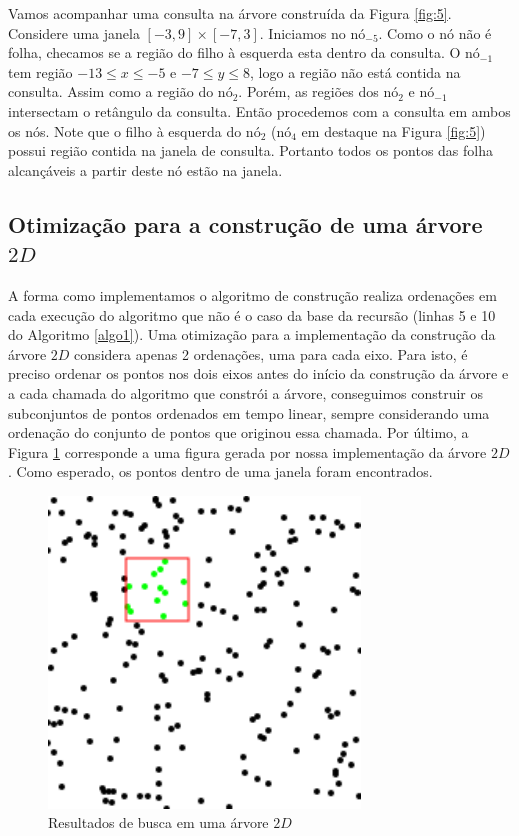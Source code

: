 Vamos acompanhar uma consulta na árvore construída da Figura \ref{fig:5}. Considere uma janela $[-3, 9]\times[-7, 3]$. %
Iniciamos no nó$_{-5}$. Como o nó não é folha, checamos se a região do filho à esquerda esta dentro da consulta. O $\mbox{nó}_{-1}$ tem região $ -13 \leq x \leq -5 $ e  $ -7 \leq y \leq 8$, logo a região não está contida na consulta. Assim como a região do nó$_2$. Porém, as regiões dos $\mbox{nó}_2$ e $\mbox{nó}_{-1}$ intersectam o retângulo da consulta. Então procedemos com a consulta em ambos os nós. %
Note que o filho à esquerda do $\mbox{nó}_{2}$ ($\mbox{nó}_4$ em destaque na Figura \ref{fig:5}) possui região contida na janela de consulta. Portanto todos os pontos das folha alcançáveis a partir deste nó estão na janela. 

\subsection{Otimização para a construção de uma árvore $2D$}
A forma como implementamos o algoritmo de construção realiza ordenações em cada execução do algoritmo que não é o caso da base da recursão (linhas 5 e 10 do Algoritmo \ref{algo1}).
Uma otimização para a implementação da construção da árvore $2D$ considera apenas 2 ordenações, uma para cada eixo. %
Para isto, é preciso ordenar os pontos nos dois eixos antes do início da construção da árvore e a cada chamada do algoritmo que constrói a árvore, conseguimos construir os subconjuntos de pontos ordenados em tempo linear, sempre considerando uma ordenação do conjunto de pontos que originou essa chamada. %
Por último, a Figura \ref{fig:7} corresponde a uma figura gerada por nossa implementação da árvore $2D$. Como esperado, os pontos dentro de uma janela foram encontrados.
\begin{figure}[ht!]
    \begin{center}
        \includegraphics{images/points.pdf}
    \end{center}
    \caption {Resultados de busca em uma árvore $2D$}
    \label{fig:7}
\end{figure}

